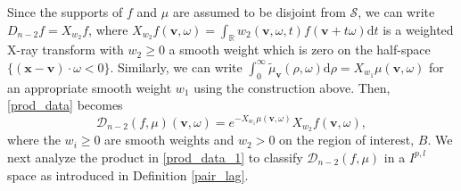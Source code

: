 \documentclass[a4paper,12pt]{amsart}
\numberwithin{equation}{section}
\theoremstyle{plain}
\numberwithin{theorem}{section}
\theoremstyle{definition}
\theoremstyle{remark}
\theoremstyle{remark}
\theoremstyle{remark}
\newcommand{\s}{\mathcal S}
\newcommand{\WF}{\mathrm{WF}}
\newcommand{\vv}{{\mathbf{v}}}
\newcommand{\vx}{{\mathbf{x}}}
\newcommand{\vy}{{\mathbf{y}}}
\begin{document}

Since the supports of $f$ and $\mu$ are assumed to be disjoint from $\s$, we can write $D_{n-2}f = X_{w_2}f$, where $X_{w_2}f(\vv,\omega) = \int_{\mathbb{R}}w_2(\vv,\omega,t) f(\vv + t\omega) \mathrm{d}t$ is a weighted X-ray transform with $w_2 \geq 0$ a smooth weight which is zero on the half-space $\{(\vx - \vv)\cdot\omega < 0\}$. Similarly, we can write $\int_0^\infty \tilde{\mu}_\vv(\rho,\omega)\mathrm{d}\rho = X_{w_1}\mu(\vv,\omega)$ for an appropriate smooth weight $w_1$ using the construction above. %
Then, \eqref{prod_data} becomes
\begin{equation}\label{prod_data_1}
\mathcal{D}_{n-2}(f,\mu)(\vv,\omega) = e^{ -X_{w_1}\mu(\vv,\omega) }  X_{w_2}f(\vv,\omega),
\end{equation}
where the $w_i \geq 0$ are smooth weights and $w_2 > 0$ on the region of interest, $B$. We next analyze the product in \eqref{prod_data_1} to classify $\mathcal{D}_{n-2}(f,\mu)$ in a $I^{p,l}$ space as introduced in Definition \ref{pair_lag}.
\end{document}
